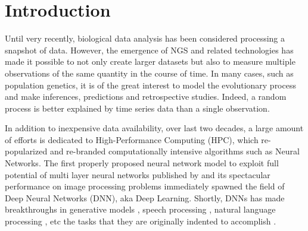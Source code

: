 \section{Introduction}
Until very recently, biological data analysis has been considered processing a snapshot of data. However, the emergence of NGS and related technologies has made it possible to not only create larger datasets but also to measure multiple observations of the same quantity in the course of time. In many cases, such as population genetics, it is of the great interest to model the evolutionary process and make inferences, predictions and retrospective studies. Indeed, a random process is better explained by time series data than a single observation.

In addition to inexpensive data availability, over last two decades, a large amount of efforts is dedicated to High-Performance Computing (HPC), which re-popularized and re-branded computationally intensive algorithms such as Neural Networks. The first properly proposed neural network model to exploit full potential of multi layer neural networks published by \cite{deep-DR, deep-belief} and its spectacular performance on image processing problems immediately spawned the field of Deep Neural Networks (DNN), aka Deep Learning. Shortly, DNNs has made breakthroughs in generative models \cite{deep-generative}, speech processing \cite{deep-speech}, natural language processing \cite{deep-nlp}, etc the tasks that they are originally indented to accomplish \cite{deep-imagenet}.

